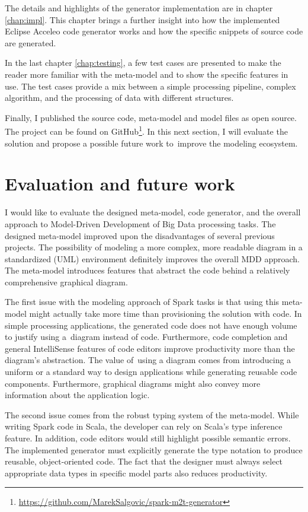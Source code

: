 The details and highlights of the generator implementation are in chapter \ref{chap:impl}. This chapter brings a further insight into how the implemented Eclipse Acceleo code generator works and how the specific snippets of source code are generated. 

In the last chapter \ref{chap:testing}, a few test cases are presented to make the reader more familiar with the meta-model and to show the specific features in use. The test cases provide a mix between a simple processing pipeline, complex algorithm, and the processing of data with different structures.

Finally, I published the source code, meta-model and model files as open source. The project can be found on GitHub\footnote{\url{https://github.com/MarekSalgovic/spark-m2t-generator}}.
In this next section, I will evaluate the solution and propose a possible future work to~improve the modeling ecosystem.

\section{Evaluation and future work}

I would like to evaluate the designed meta-model, code generator, and the overall approach to Model-Driven Development of Big Data processing tasks. The designed meta-model improved upon the disadvantages of several previous projects. The possibility of modeling a more complex, more readable diagram in a standardized (UML) environment definitely improves the overall MDD approach. The meta-model introduces features that abstract the code behind a relatively comprehensive graphical diagram. 

The first issue with the modeling approach of Spark tasks is that using this meta-model might actually take more time than provisioning the solution with code. In simple processing applications, the generated code does not have enough volume to justify using a~diagram instead of code. Furthermore, code completion and general IntelliSense features of code editors improve productivity more than the diagram's abstraction. The value of~using a diagram comes from introducing a uniform or a standard way to design applications while generating reusable code components. Furthermore, graphical diagrams might also convey more information about the application logic. 

The second issue comes from the robust typing system of the meta-model. While writing Spark code in Scala, the developer can rely on Scala's type inference feature. In addition, code editors would still highlight possible semantic errors. The implemented generator must explicitly generate the type notation to produce reusable, object-oriented code. The fact that the designer must always select appropriate data types in specific model parts also reduces productivity.

